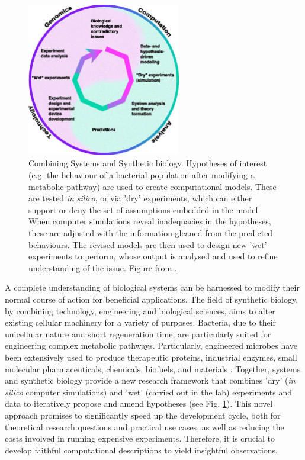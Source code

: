 \documentclass[bsc,frontabs,singlespacing,parskip,deptreport]{infthesis}
\begin{document}
\begin{figure}
    \centering
    \includegraphics[width=0.6\textwidth]{Images/Other/systems biology.pdf}
    \caption{Combining Systems and Synthetic biology. Hypotheses of interest (e.g. the behaviour of a bacterial population after modifying a metabolic pathway) are used to create computational models. These are tested \textit{in silico}, or via 'dry' experiments, which can either support or deny the set of assumptions embedded in the model. When computer simulations reveal inadequacies in the hypotheses, these are adjusted with the information gleaned from the predicted behaviours. The revised models are then used to design new 'wet' experiments to perform, whose output is analysed and used to refine understanding of the issue. Figure from \cite{Kitano02systemsbiology:}. }
    \label{fig:syst_synth_bio}
\end{figure}

A complete understanding of biological systems can be harnessed to modify their normal course of action for beneficial applications. The field of synthetic biology, by combining technology, engineering and biological sciences, aims to alter existing cellular machinery for a variety of purposes. Bacteria, due to their unicellular nature and short regeneration time, are particularly suited for engineering complex metabolic pathways. Particularly, engineered microbes have been extensively used to produce therapeutic proteins, industrial enzymes, small molecular pharmaceuticals, chemicals, biofuels, and materials \cite{pmid23898328}. Together, systems and synthetic biology provide a new research framework that combines 'dry' (\textit{in silico} computer simulations) and 'wet' (carried out in the lab) experiments and data to iteratively propose and amend hypotheses (see Fig. \ref{fig:syst_synth_bio}). This novel approach promises to significantly speed up the development cycle, both for theoretical research questions and practical use cases, as well as reducing the costs involved in running expensive experiments. Therefore, it is crucial to develop faithful computational descriptions to yield insightful observations. 
\end{document}
